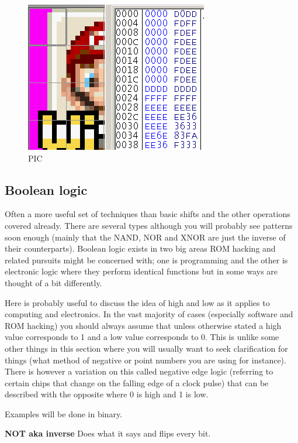 \documentclass[
]{book}
\begin{document}
\begin{figure}
\centering
\includegraphics{images/0_home_fast6191_romhackingguide_unrenamed_files_and_original_borders_romhackingendiandemo.png}
\caption{PIC}
\end{figure}

\hypertarget{boolean-logic}{%
\subsection{Boolean logic}\label{boolean-logic}}

Often a more useful set of techniques than basic shifts and the other operations covered already. There are several types although you will probably see patterns soon enough (mainly that the NAND, NOR and XNOR are just the inverse of their counterparts). Boolean logic exists in two big areas ROM hacking and related pursuits might be concerned with; one is programming and the other is electronic logic where they perform identical functions but in some ways are thought of a bit differently.

Here is probably useful to discuss the idea of high and low as it applies to computing and electronics. In the vast majority of cases (especially software and ROM hacking) you should always assume that unless otherwise stated a high value corresponds to 1 and a low value corresponds to 0. This is unlike some other things in this section where you will usually want to seek clarification for things (what method of negative or point numbers you are using for instance). There is however a variation on this called negative edge logic (referring to certain chips that change on the falling edge of a clock pulse) that can be described with the opposite where 0 is high and 1 is low.

Examples will be done in binary.

\textbf{NOT aka inverse} Does what it says and flips every bit.
\end{document}
